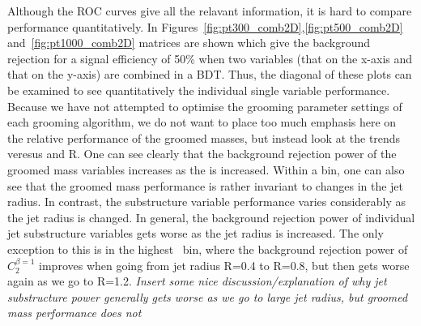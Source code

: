 %

Although the ROC curves give all the relavant information, it is hard
to compare performance quantitatively. In
Figures~\ref{fig:pt300_comb2D},\ref{fig:pt500_comb2D}
and~\ref{fig:pt1000_comb2D} matrices are shown which give the
background rejection for a signal efficiency of 50\% when two
variables (that on the x-axis and that on the y-axis) are combined in
a BDT. Thus, the diagonal of these plots can be examined to see
quantitatively the individual single variable performance. Because we
have not attempted to optimise the grooming parameter settings of
each grooming algorithm, we do not want to place too much emphasis
here on the relative performance of the groomed masses, but instead
look at the trends veresus \pt and R. One
can see clearly that the background rejection power of the groomed mass
variables increases as the \pt is increased. Within a \pt
bin, one can also see that the groomed mass performance is rather invariant to
changes in the jet radius. In contrast, the substructure variable
performance varies considerably as the jet radius is changed. In
general, the background rejection power of individual jet substructure
variables gets worse as the jet radius is increased. The only
exception to this is in the highest \pt~bin, where the background
rejection power of $C_2^{\beta=1}$ improves when going from jet radius
R=0.4 to R=0.8, but then gets worse again as we go to R=1.2. {\it
  Insert some nice discussion/explanation of why jet substructure
  power generally gets worse as we go to large jet radius, but groomed
mass performance does not}

